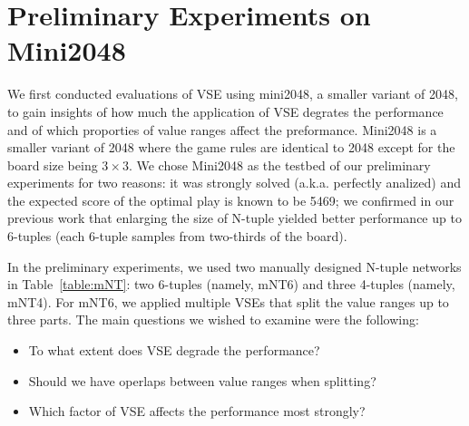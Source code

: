 \section{Preliminary Experiments on Mini2048}


We first conducted evaluations of VSE using mini2048, a smaller variant of 2048, to gain insights of how much the application of VSE degrates the performance and of which proporties of value ranges affect the preformance.
Mini2048 is a smaller variant of 2048 where the game rules are identical to 2048 except for the board size being $3\times 3$.
We chose Mini2048 as the testbed of our preliminary experiments for two reasons: it was strongly solved (a.k.a. perfectly analized) and the expected score of the optimal play is known to be 5469; we confirmed in our previous work that enlarging the size of N-tuple yielded better performance up to 6-tuples (each 6-tuple samples from two-thirds of the board).


In the preliminary experiments, we used two manually designed N-tuple networks in Table~\ref{table:mNT}: two 6-tuples (namely, \textsf{mNT6}) and three 4-tuples (namely, \textsf{mNT4}). For \textsf{mNT6}, we applied multiple VSEs that split the value ranges up to three parts.
The main questions we wished to examine were the following:
\begin{itemize}
 \item To what extent does VSE degrade the performance?
 \item Should we have operlaps between value ranges when splitting?
 \item Which factor of VSE affects the performance most strongly?
\end{itemize}


